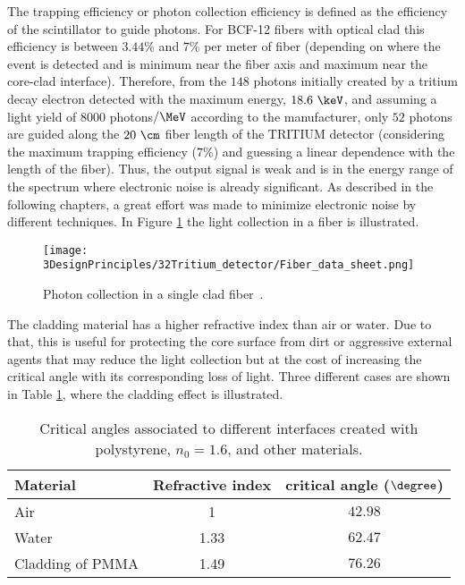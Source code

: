 The trapping efficiency or photon collection efficiency is defined as the efficiency of the scintillator to guide photons. For BCF-12 fibers with optical clad this efficiency is between $3.44\%$ and $7\%$ per meter of fiber (depending on where the event is detected and is minimum near the fiber axis  and maximum near the core-clad interface). Therefore, from the $148$ photons initially created by a tritium decay electron detected with the maximum energy, $18.6~\keV$, and assuming a light yield of $8000$ photons$/\MeV$ according to the manufacturer, only $52$ photons are guided along the $20~\cm$ fiber length of the TRITIUM detector (considering the maximum trapping efficiency ($7\%$) and guessing a linear dependence with the length of the fiber). Thus, the output signal is weak and is in the energy range of the spectrum where electronic noise is already significant. As described in the following chapters, a great effort was made to minimize electronic noise by different techniques. In Figure \ref{fig:Fiber_physic} the light collection in a fiber is illustrated.

\begin{figure}[htbp]
\centering
\texttt{[image: 3DesignPrinciples/32Tritium\_detector/Fiber\_data\_sheet.png]}
\caption{Photon collection in a single clad fiber\label{fig:Fiber_physic}~\cite{DataSheetBCF12Fiber}.}
\end{figure}

The cladding material has a higher refractive index than air or water. Due to that, this is useful for protecting the core surface from dirt or aggressive external agents that may reduce the light collection but at the cost of increasing the critical angle with its corresponding loss of light. Three different cases are shown in Table \ref{tab:CriticalAngles}, where the cladding effect is illustrated.

\begin{table}[htbp]
\centering{}%
\begin{tabular}{lcc}
\toprule 
Material & Refractive index & critical angle ($\degree$) \tabularnewline
\midrule
\midrule 
Air & 1 & $42.98$ \tabularnewline
Water & 1.33 & $62.47$ \tabularnewline
Cladding of PMMA & 1.49 & $76.26$ \tabularnewline
\bottomrule
\end{tabular}
\caption{Critical angles associated to different interfaces created with polystyrene, $n_0=1.6$, and other materials.}
\label{tab:CriticalAngles}
\end{table}


